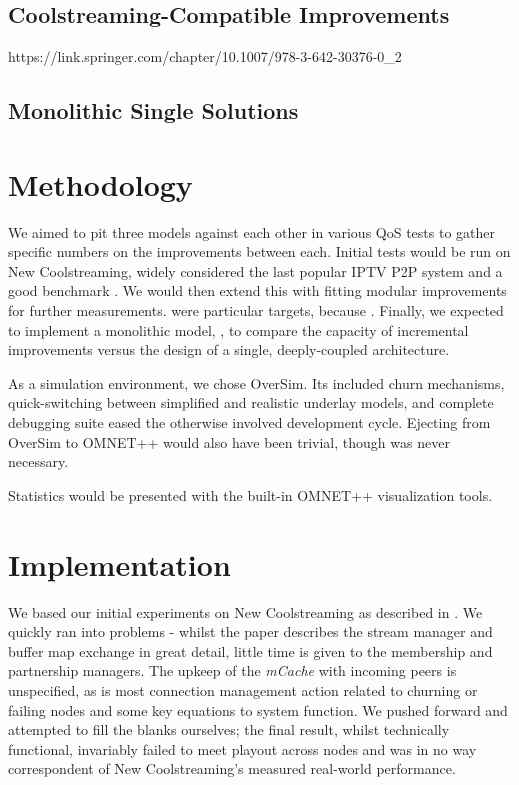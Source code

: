 \documentclass[12pt,a4paper]{article}
\begin{document}
\subsection{Coolstreaming-Compatible Improvements} \label{litreview:specifics}
https://link.springer.com/chapter/10.1007/978-3-642-30376-0\_2
\subsection{Monolithic Single Solutions} \label{litreview:monoliths}
\section{Methodology} \label{methodology}
We aimed to pit three models against each other in various QoS tests  to gather specific numbers on the improvements between each. Initial tests would be run on New Coolstreaming, widely considered the last popular IPTV P2P system and a good benchmark . We would then extend this with fitting modular improvements for further measurements.  were particular targets, because . Finally, we expected to implement a monolithic model, , to compare the capacity of incremental improvements versus the design of a single, deeply-coupled architecture.

As a simulation environment, we chose OverSim. Its included churn mechanisms, quick-switching between simplified and realistic underlay models, and complete debugging suite eased the otherwise involved development cycle. Ejecting from OverSim to OMNET++ would also have been trivial, though was never necessary.

Statistics would be presented with the built-in OMNET++ visualization tools.

\section{Implementation} \label{implementation}
We based our initial experiments on New Coolstreaming as described in \cite{Li2008}. We quickly ran into problems - whilst the paper describes the stream manager and buffer map exchange in great detail, little time is given to the membership and partnership managers. The upkeep of the \textit{mCache} with incoming peers is unspecified, as is most connection management action related to churning or failing nodes and some key equations to system function. We pushed forward and attempted to fill the blanks ourselves; the final result, whilst technically functional, invariably failed to meet playout across nodes and was in no way correspondent of New Coolstreaming's measured real-world performance.
\end{document}
